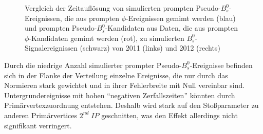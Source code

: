 \documentclass{article}
\begin{document}
\begin{figure}[h!]
\caption{Vergleich der Zeitauflösung von simulierten prompten Pseudo-$B_s^0$-Ereignissen, die aus prompten $\phi$-Ereignissen gemimt werden (blau) und prompten Pseudo-$B_s^0$-Kandidaten aus Daten, die aus prompten $\phi$-Kandidaten gemimt werden (rot), zu simulierten $B_s^0$-Signalereignissen (schwarz) von 2011 (links) und 2012 (rechts)}
\label{fig:trescomparison}
\end{figure} 

Durch die niedrige Anzahl simulierter prompter Pseudo-$B_s^0$-Ereignisse befinden sich in der Flanke der Verteilung einzelne Ereignisse, die nur durch das Normieren stark gewichtet und in ihrer Fehlerbreite mit Null vereinbar sind. Untergrundereignisse mit hohen "`negativen Zerfallszeiten"' könnten durch  Primärvertexzuordnung entstehen. Deshalb wird stark auf den Stoßparameter zu anderen Primärvertices $2^{nd}\;IP$ geschnitten, was den Effekt allerdings nicht signifikant verringert.



\end{document}
